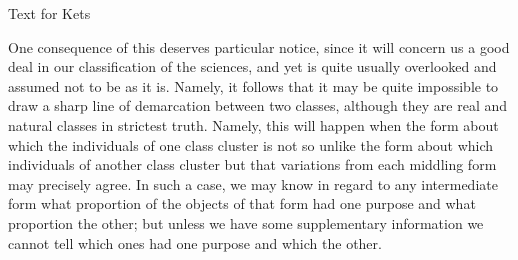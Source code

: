 Text for Kets

 One consequence of this deserves particular notice, since it will concern us a good deal in our classification of the sciences, and yet is quite usually overlooked and assumed not to be as it is. Namely, it follows that it may be quite impossible to draw a sharp line of demarcation between two classes, although they are real and natural classes in strictest truth. Namely, this will happen when the form about which the individuals of one class cluster is not so unlike the form about which individuals of another class cluster but that variations from each middling form may precisely agree. In such a case, we may know in regard to any intermediate form what proportion of the objects of that form had one purpose and what proportion the other; but unless we have some supplementary information we cannot tell which ones had one purpose and which the other.
